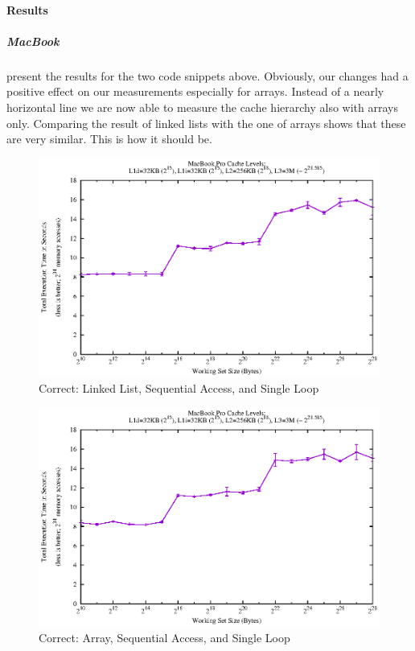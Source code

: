 \paragraph{Results}\label{results-13}

\hypertarget{macbook}{\subparagraph{MacBook}\label{macbook}}

 present the results for the two code snippets above.
Obviously, our changes had a positive effect on our measurements
especially for arrays. Instead of a nearly horizontal line we are now
able to measure the cache hierarchy also with arrays only. Comparing the
result of linked lists with the one of arrays shows that these are very
similar. This is how it should be.

\begin{figure}[htbp]
\centering
\includegraphics{appendix/plots-cache-measurements/plot-correct-ll}
\caption{Correct: Linked List, Sequential Access, and Single Loop}
\label{app:correct-ll-seqacc-sl}
\end{figure}

\begin{figure}[htbp]
\centering
\includegraphics{appendix/plots-cache-measurements/plot-correct-array}
\caption{Correct: Array, Sequential Access, and Single Loop}
\label{app:correct-arr-seqacc-sl}
\end{figure}

